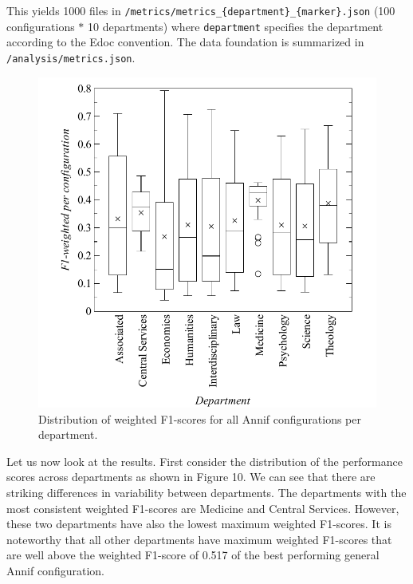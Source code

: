 \begin{Shaded}
\begin{Highlighting}[]
\end{Highlighting}
\end{Shaded}

This yields 1000 files in
\texttt{/metrics/metrics\_\{department\}\_\{marker\}.json} (100
configurations \(*\) 10 departments) where \texttt{department} specifies
the department according to the Edoc convention. The data foundation is
summarized in \texttt{/analysis/metrics.json}.

\begin{figure}
\centering
\includegraphics{images/metrics_dept_distribution.pdf}
\caption{Distribution of weighted F1-scores for all Annif configurations
per department.}
\end{figure}

Let us now look at the results. First consider the distribution of the
performance scores across departments as shown in Figure 10. We can see
that there are striking differences in variability between departments.
The departments with the most consistent weighted F1-scores are Medicine
and Central Services. However, these two departments have also the
lowest maximum weighted F1-scores. It is noteworthy that all other
departments have maximum weighted F1-scores that are well above the
weighted F1-score of 0.517 of the best performing general Annif
configuration.

